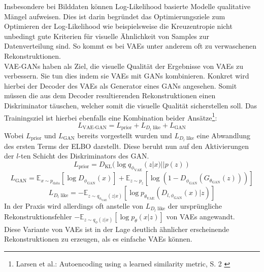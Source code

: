 Insbesondere bei Bilddaten können Log-Likelihood basierte Modelle qualitative Mängel aufweisen. Dies ist darin begründet das Optimierungsziele zum Optimieren der Log-Likelihood wie beispielsweise die Kreuzentropie nicht unbedingt gute Kriterien für visuelle Ähnlichkeit von Samples zur Datenverteilung sind. So kommt es bei \ac{VAE}s unter anderem oft zu verwaschenen Rekonstruktionen. \\
VAE-GANs haben als Ziel, die visuelle Qualität der Ergebnisse von \ac{VAE}s zu verbessern. Sie tun dies indem sie \ac{VAE}s mit \ac{GAN}s kombinieren. Konkret wird hierbei der Decoder des \ac{VAE}s als Generator eines \ac{GAN}s angesehen. Somit müssen die aus dem Decoder resultierenden Rekonstruktionen einen Diskriminator täuschen, welcher somit die visuelle Qualität sicherstellen soll. Das Trainingsziel ist hierbei ebenfalls eine Kombination beider Ansätze\footnote{
    Larsen et al.: Autoencoding using a learned similarity metric, S. 2
    \cite{larsen2016autoencoding}
}:
\begin{equation}
    L_\text{VAE-GAN}
    =  L_\text{prior} +  L_{D_l\text{ like}} +  L_\text{GAN}
\end{equation}
Wobei $ L_\text{prior}$ und $ L_\text{GAN}$ bereits vorgestellt wurden und $ L_{D_l\text{ like}}$ eine Abwandlung des ersten Terms der \ac{ELBO} darstellt. Diese beruht nun auf den Aktivierungen der $l$-ten Schicht des Diskriminators des \ac{GAN}. 
\begin{equation}
    L_\text{prior} 
    = D_\text{KL} (\log q_{\phi_\text{VAE}}(z|x) || p(z))
\end{equation}
\begin{equation}
    L_\text{GAN} = \mathbb E_{x \sim p_\text{data}}[\log D_{\phi_\text{GAN}}(x)] 
    + \mathbb E_{z \sim p_z}
    [\log (1 - D_{\phi_\text{GAN}}(G_{\theta_\text{GAN}}(z)))]
\end{equation}
\begin{equation}
    L_{D_l\text{ like}} = 
    - \mathbb E_{z \sim q_{\phi_\text{VAE}}(z|x)}
    \left [
        \log p_{\theta_\text{VAE}}(D_{l, \phi_\text{GAN}}(x)|z)
    \right ]
\end{equation}
In der Praxis wird allerdings oft anstelle von $L_{D_l\text{ like}}$ der ursprüngliche Rekonstruktionsfehler $- \mathbb E_{z \sim q_{\phi}(z|x)}
    \left [
        \log p_\theta(x|z)
    \right ]$ von \ac{VAE}s angewandt. \\
Diese Variante von \ac{VAE}s ist in der Lage deutlich ähnlicher erscheinende Rekonstruktionen zu erzeugen, als es einfache VAEs können.


